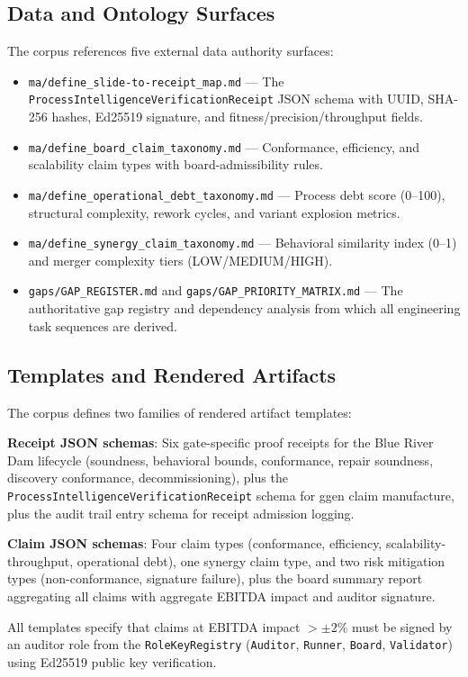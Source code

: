 \subsection{Data and Ontology Surfaces}
\label{sec:prompts-implementation-data}

The corpus references five external data authority surfaces:

\begin{itemize}
  \item \texttt{ma/define\_slide-to-receipt\_map.md} --- The
    \texttt{ProcessIntelligenceVerificationReceipt} JSON schema with UUID, SHA-256
    hashes, Ed25519 signature, and fitness/precision/throughput fields.
  \item \texttt{ma/define\_board\_claim\_taxonomy.md} --- Conformance, efficiency,
    and scalability claim types with board-admissibility rules.
  \item \texttt{ma/define\_operational\_debt\_taxonomy.md} --- Process debt score
    (0--100), structural complexity, rework cycles, and variant explosion metrics.
  \item \texttt{ma/define\_synergy\_claim\_taxonomy.md} --- Behavioral similarity
    index (0--1) and merger complexity tiers (LOW/MEDIUM/HIGH).
  \item \texttt{gaps/GAP\_REGISTER.md} and \texttt{gaps/GAP\_PRIORITY\_MATRIX.md}
    --- The authoritative gap registry and dependency analysis from which all
    engineering task sequences are derived.
\end{itemize}

\subsection{Templates and Rendered Artifacts}
\label{sec:prompts-implementation-templates}

The corpus defines two families of rendered artifact templates:

\textbf{Receipt JSON schemas}: Six gate-specific proof receipts for the Blue River
Dam lifecycle (soundness, behavioral bounds, conformance, repair soundness, discovery
conformance, decommissioning), plus the \texttt{ProcessIntelligenceVerificationReceipt}
schema for ggen claim manufacture, plus the audit trail entry schema for receipt
admission logging.

\textbf{Claim JSON schemas}: Four claim types (conformance, efficiency,
scalability-throughput, operational debt), one synergy claim type, and two risk
mitigation types (non-conformance, signature failure), plus the board summary report
aggregating all claims with aggregate EBITDA impact and auditor signature.

All templates specify that claims at EBITDA impact $> \pm2\%$ must be signed by an
auditor role from the \texttt{RoleKeyRegistry} (\texttt{Auditor}, \texttt{Runner},
\texttt{Board}, \texttt{Validator}) using Ed25519 public key verification.
